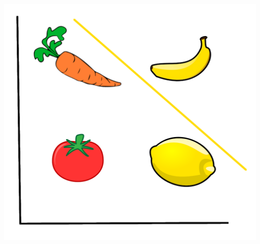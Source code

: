 \documentclass[aspectratio=169,xcolor=dvipsnames]{beamer}
\begin{document}
\begin{frame}
\begin{center}
\includegraphics[height=0.8\paperheight,keepaspectratio]{images/coordinates_veggi_line} 
\end{center}
\end{frame}


\begin{frame}
\end{frame}
\end{document}
